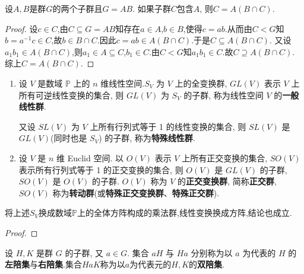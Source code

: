 \documentclass[../../main.tex]{subfiles}%
\begin{document}
\begin{example}
设$A, B$是群$G$的两个子群且$G=AB$. 如果子群$C$包含$A$, 则$C=A(B\cap C)$.
\end{example}
\begin{proof}
设$c\in C$,由$C\subseteq G=AB$知存在$a\in A$,$b\in B$,使得$c=ab$.从而由$C<G$知$b=a^{-1}c\in C$,故$b\in B\cap C$.因此$c=ab\in A\left( B\cap C \right)$.于是$C\subseteq A\left( B\cap C \right)$.
又设$a_1b_1\in A\left( B\cap C \right)$,则$a_1\in A\subseteq C$,$b_1\in C$.由$C<G$知$a_1b_1\in C$.故$C\supseteq A\left( B\cap C \right)$.
综上$C=A\left( B\cap C \right)$.
\end{proof}

\begin{theorem}
\begin{enumerate}
\item 设 \( V \) 是数域 \( \mathbb{P} \) 上的 \( n \) 维线性空间.\( S_V \) 为 \( V \) 上的全变换群, \( GL(V) \) 表示 \( V \) 上所有可逆线性变换的集合, 则 \( GL(V) \) 为 \( S_V \) 的子群, 称为线性空间 \( V \) 的\textbf{一般线性群}. 

又设 \( SL(V) \) 为 \( V \) 上所有行列式等于 1 的线性变换的集合, 则 \( SL(V) \) 是 \( GL(V) \)(同时也是 \( S_V \)) 的子群, 称为\textbf{特殊线性群}.

\item 设 \( V \) 是 \( n \) 维 Euclid 空间. 以 \( O(V) \) 表示 \( V \) 上所有正交变换的集合, \( SO(V) \) 表示所有行列式等于 1 的正交变换的集合, 则 \( O(V) \) 是 \( GL(V) \) 的子群, \( SO(V) \) 是 \( O(V) \) 的子群. \( O(V) \) 称为 \( V \) 的\textbf{正交变换群}, 简称\textbf{正交群}, \( SO(V) \) 称为\textbf{转动群}(或\textbf{特殊正交变换群}、\textbf{特殊正交群}).
\end{enumerate}
\end{theorem}
\begin{remark}
将上述$S_V$换成数域$\mathbb{P}$上的全体方阵构成的乘法群,线性变换换成方阵,结论也成立.
\end{remark}
\begin{proof}

\end{proof}

\begin{definition}
设 \( H,K \) 是群 \( G \) 的子群, 又 \( a \in G \). 集合 \( aH \) 与 \( Ha \) 分别称为以 \( a \) 为代表的 \( H \) 的\textbf{左陪集}与\textbf{右陪集}.集合$HaK$称为以$a$为代表元的$H,K$的\textbf{双陪集}.
\end{definition}
\end{document}
